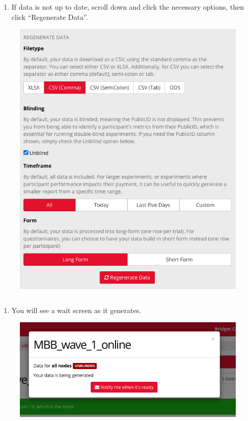\documentclass[]{book}
\providecommand{\tightlist}{%
  \setlength{\itemsep}{0pt}\setlength{\parskip}{0pt}}
\begin{document}
\begin{enumerate}
\def\labelenumi{\arabic{enumi}.}
\setcounter{enumi}{2}
\tightlist
\item
  If data is not up to date, scroll down and click the necessary options, then click ``Regenerate Data''.
\end{enumerate}

\begin{figure}
\centering
\includegraphics{images/gorilla/8.png}
\caption{}
\end{figure}

\begin{enumerate}
\def\labelenumi{\arabic{enumi}.}
\setcounter{enumi}{3}
\tightlist
\item
  You will see a wait screen as it generates.
\end{enumerate}

\begin{figure}
\centering
\includegraphics{images/gorilla/9.png}
\caption{}
\end{figure}
\end{document}
